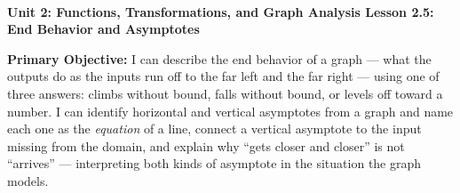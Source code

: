 \documentclass[10pt]{article}
\newcommand{\UnitNumberName}{Unit 2: Functions, Transformations, and Graph Analysis \quad}
\newcommand{\LessonNumberName}{Lesson 2.5: End Behavior and Asymptotes}
\begin{document}
\begin{center}
    {\Large\bfseries \CourseName \\
    {\small\bfseries \UnitNumberName \LessonNumberName}}
\end{center}

\begin{tcolorbox}[colback=mist, colframe=royal, boxrule=0.9pt, arc=2mm,
    left=2mm, right=2mm, top=1.5mm, bottom=1.5mm]
    \textbf{Primary Objective:} I can describe the end behavior of a graph --- what the outputs do as
    the inputs run off to the far left and the far right --- using one of three answers: climbs
    without bound, falls without bound, or levels off toward a number. I can identify horizontal and
    vertical asymptotes from a graph and name each one as the \emph{equation} of a line, connect a
    vertical asymptote to the input missing from the domain, and explain why ``gets closer and
    closer'' is not ``arrives'' --- interpreting both kinds of asymptote in the situation the graph
    models.
\end{tcolorbox}
\end{document}
